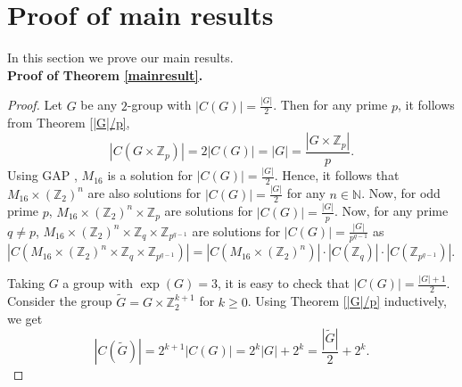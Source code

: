 \documentclass[a4paper,11pt]{amsart}
\numberwithin{equation}{section}
\numberwithin{equation}{subsection}
\begin{document}
\section{Proof of main results}
In this section we prove our main results.\\


\noindent \textbf{Proof of Theorem \ref{mainresult}.}
\begin{proof}
Let $G$ be any $2$-group with $|C(G)|=\frac{|G|}{2}$.  
Then for any prime $p$, it follows from  Theorem \ref{|G|/p},
$$|C(G\times\mathbb{Z}_{p})|=2|C(G)|=|G|=\frac{|G\times\mathbb{Z}_{p}|}{p}.$$ 
 Using GAP \cite{GAP}, $M_{16}$ is a solution for $|C(G)|=\frac{|G|}{2}$. Hence, it follows that $M_{16}\times (\mathbb Z_{2})^n$ are also solutions for $|C(G)|=\frac{|G|}{2}$ for any $n\in \mathbb N$. Now,  for odd prime $p$, $M_{16}\times (\mathbb Z_{2})^n\times \mathbb Z_p$ are solutions for $|C(G)|=\frac{|G|}{p}$. 
Now, for any prime $q\neq p$, $M_{16}\times (\mathbb Z_{2})^n\times \mathbb Z_q \times \mathbb{Z}_{p^{q-1}}$ are solutions for $|C(G)|=\frac{|G|}{p^{q-1}}$ as $|C(M_{16}\times (\mathbb Z_{2})^n\times \mathbb Z_q \times \mathbb{Z}_{p^{q-1}})|=|C(M_{16}\times (\mathbb Z_{2})^n)|\cdot |C(\mathbb{Z}_q)|\cdot |C(\mathbb{Z}_{p^{q-1}})|$.



Taking $G$ a group with $\exp{(G)}=3$, it is easy to check that $|C(G)|=\frac{|G|+1}{2}$. 
Consider the group $\widetilde{G}=G\times \mathbb{Z}_{2}^{k+1}$ for  $k\geq 0$. Using Theorem \ref{|G|/p} inductively, we get $$|C(\widetilde{G})|=2^{k+1}|C(G)|=2^{k}|G|+2^{k}=\frac{|\widetilde{G}|}{2}+2^{k}.$$
\end{proof}
\end{document}
